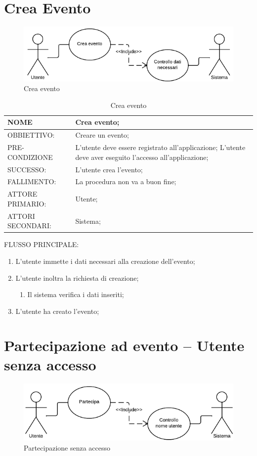 \section{Crea Evento}
\begin{figure}[h!]
\centering
\includegraphics[scale=0.60]{img/use/creaevento.png}
\caption{Crea evento}
\label{fig:creaeve}
\end{figure}
\begin{table}[H]
\begin{tabular}{p{}|p{}}
\toprule
NOME & Crea evento;\\
\hline
OBBIETTIVO: & Creare un evento;\\
\hline
PRE-CONDIZIONE & L'utente deve essere registrato all'applicazione;
L'utente deve aver eseguito l'accesso all'applicazione;\\
\hline
SUCCESSO: & L'utente crea l'evento;\\
\hline
FALLIMENTO: & La procedura non va a buon fine;\\
\hline
ATTORE PRIMARIO: & Utente;\\
\hline
ATTORI SECONDARI: & Sistema;\\
\bottomrule
\end{tabular}
\caption{Crea evento}
\label{table:creaevento}
\end{table}
FLUSSO PRINCIPALE:
\begin{enumerate}
\item L'utente immette i dati necessari alla creazione dell'evento;
\item L'utente inoltra la richiesta di creazione;
\begin{enumerate}
\item Il sistema verifica i dati inseriti;
\end{enumerate}
\item L'utente ha creato l'evento;
\end{enumerate}

\section{Partecipazione ad evento – Utente senza accesso}
\begin{figure}[h!]
\centering
\includegraphics[scale=0.60]{img/use/PartecipaSa.png}
\caption{Partecipazione senza accesso}
\label{fig:ParteSA}
\end{figure}

